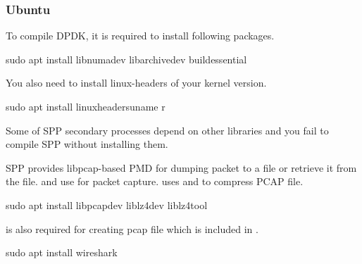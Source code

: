 \documentclass[a4paper,11pt,openany,oneside,english]{sphinxmanual}
\begin{document}
\subsubsection{Ubuntu}
\label{\detokenize{gsg/install:ubuntu}}
To compile DPDK, it is required to install following packages.

\begin{sphinxVerbatim}[commandchars=\\\{\},formatcom=\footnotesize]
 sudo apt install libnuma\PYGZhy{}dev 
  libarchive\PYGZhy{}dev 
  build\PYGZhy{}essential
\end{sphinxVerbatim}

You also need to install linux-headers of your kernel version.

\begin{sphinxVerbatim}[commandchars=\\\{\},formatcom=\footnotesize]
 sudo apt install linux\PYGZhy{}headers\PYGZhy{}uname \PYGZhy{}r
\end{sphinxVerbatim}

Some of SPP secondary processes depend on other libraries and you fail to
compile SPP without installing them.

SPP provides libpcap-based PMD for dumping packet to a file or retrieve
it from the file.
 and  use  for packet capture.
 uses  and  to compress PCAP file.

\begin{sphinxVerbatim}[commandchars=\\\{\},formatcom=\footnotesize]
 sudo apt install libpcap\PYGZhy{}dev 
  liblz4\PYGZhy{}dev 
  liblz4\PYGZhy{}tool
\end{sphinxVerbatim}

 is also required for creating pcap file which
is included in .

\begin{sphinxVerbatim}[commandchars=\\\{\},formatcom=\footnotesize]
 sudo apt install wireshark
\end{sphinxVerbatim}
\end{document}
